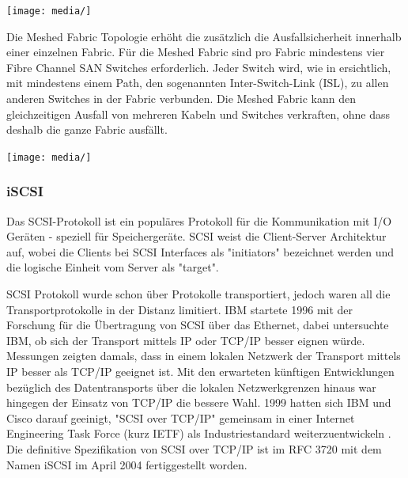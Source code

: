 \begin{center}
\texttt{[image: media/]}
\end{center}

Die Meshed Fabric Topologie erhöht die zusätzlich die Ausfallsicherheit innerhalb einer einzelnen Fabric. Für die Meshed Fabric sind pro Fabric mindestens vier Fibre Channel SAN Switches erforderlich. Jeder Switch wird, wie in  ersichtlich, mit mindestens einem Path, den sogenannten Inter-Switch-Link (ISL), zu allen anderen Switches in der Fabric verbunden. Die Meshed Fabric kann den gleichzeitigen Ausfall von mehreren Kabeln und Switches verkraften, ohne dass deshalb die ganze Fabric ausfällt.\cite{Christopher2009}

\begin{center}
\texttt{[image: media/]}
\end{center}

\subsubsection{iSCSI}
Das SCSI-Protokoll ist ein populäres Protokoll für die Kommunikation mit I/O Geräten - speziell für Speichergeräte. SCSI weist die Client-Server Architektur auf, wobei die Clients bei SCSI Interfaces als "initiators" bezeichnet werden und die logische Einheit vom Server als "target".

SCSI Protokoll wurde schon über Protokolle transportiert, jedoch waren all die Transportprotokolle in der Distanz limitiert. \gls{IBM} startete 1996 mit der Forschung für die Übertragung von SCSI über das Ethernet, dabei untersuchte \gls{IBM}, ob sich der Transport mittels IP oder \gls{TCP/IP} besser eignen würde. Messungen zeigten damals, dass in einem lokalen Netzwerk der Transport mittels IP besser als TCP/IP geeignet ist. Mit den erwarteten künftigen Entwicklungen bezüglich des Datentransports über die lokalen Netzwerkgrenzen hinaus war hingegen der Einsatz von TCP/IP die bessere Wahl. 1999 hatten sich \gls{IBM} und \gls{Cisco} darauf geeinigt, "SCSI over TCP/IP" gemeinsam in einer Internet Engineering Task Force (kurz \gls{IETF}) als Industriestandard weiterzuentwickeln \cite{JohnL.202}. Die definitive Spezifikation von SCSI over \gls{TCP/IP} ist im \gls{RFC} 3720 mit dem Namen iSCSI im April 2004 fertiggestellt worden.\cite{J.Satran2004}

